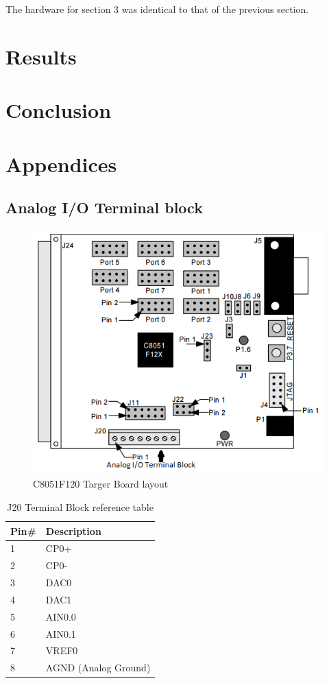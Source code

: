 \documentclass[12pt]{article}
\begin{document}
The hardware for section 3 was identical to that of the previous section. 

\section{Results}




\section{Conclusion}






\pagebreak
\section{Appendices}
\subsection{Analog I/O Terminal block}
	\begin{figure}[H]
		\centering
		\includegraphics[]{board.png}
		\caption{C8051F120 Targer Board layout}
		\label{board layout}
	\end{figure} 
	\begin{table}[h]
		\centering
		\begin{tabular}{|l|l|}
			\hline
			Pin\# & Description \\ \hline
			1 & CP0+\\ \hline
			2 & CP0-\\ \hline
			3 & DAC0\\ \hline
			4 & DAC1\\ \hline
			5 & AIN0.0\\ \hline
			6 & AIN0.1\\ \hline
			7 & VREF0\\ \hline
			8 & AGND (Analog Ground)\\ \hline
		\end{tabular}
		\caption{J20 Terminal Block reference table}
		\label{refTable}
	\end{table}
\end{document}
